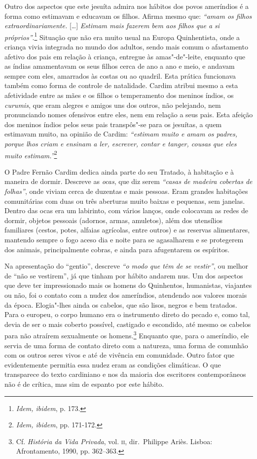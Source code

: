 Outro dos aspectos que este jesuíta admira nos hábitos dos povos
ameríndios é a forma como estimavam e educavam os filhos. Afirma mesmo
que: \textit{``amam os filhos extraordinariamente.} [\ldots{}] \textit{Estimam
mais fazerem bem aos filhos que a si próprios''}.\footnote{ \textit{Idem, ibidem}, 
p. 173.} Situação que não era muito usual na
Europa Quinhentista, onde a criança vivia integrada no mundo dos
adultos, sendo mais comum o afastamento afetivo dos pais em relação à
criança, entregue às amas"-de"-leite, enquanto que as índias amamentavam
os seus filhos cerca de ano a ano e meio, e andavam sempre com eles,
amarrados às costas ou ao quadril. Esta prática funcionava também como
forma de controle de natalidade. Cardim atribui mesmo a esta
afetividade entre as mães e os filhos o temperamento dos meninos
índios, os \textit{curumis}, que eram alegres e amigos uns dos outros,
não pelejando, nem pronunciando nomes ofensivos entre eles, nem em
relação a seus pais. Esta afeição dos meninos índios pelos seus pais
transpôs"-se para os jesuítas, a quem estimavam muito, na opinião de
Cardim: \textit{``estimam muito e amam os padres, porque lhos
criam e ensinam a ler, escrever, contar e tanger, cousas que eles muito
estimam.''}\footnote{ \textit{Idem, ibidem}, pp. 171-172.} 

 O Padre Fernão Cardim dedica ainda parte do seu Tratado, 
à habitação e à maneira de dormir. Descreve as \textit{ocas}, que diz
serem \textit{``casas de madeira cobertas de folhas''}, onde
viviam cerca de duzentas e mais pessoas. Eram grandes habitações
comunitárias com duas ou três aberturas muito baixas e pequenas, sem
janelas. Dentro das ocas era um labirinto, com vários lanços, 
onde colocavam as redes de dormir, objetos pessoais (adornos, armas, amuletos), além dos
utensílios familiares (cestos, potes, alfaias agrícolas, entre outros)
e as reservas alimentares, mantendo sempre o fogo aceso dia e noite
para se agasalharem e se protegerem dos animais, principalmente cobras,
e ainda para afugentarem os espíritos. 

 Na apresentação do ``gentio'', descreve \textit{``o modo
que têm de se vestir''}, ou melhor de ``não se vestirem'', já que
tinham por hábito andarem nus. Um dos aspectos que deve ter
impressionado mais os homens do Quinhentos, humanistas, viajantes ou
não, foi o contato com a nudez dos ameríndios, atendendo aos valores
morais da época. Elogia"-lhes ainda os cabelos, que são lisos, negros e
bem tratados. Para o europeu, o corpo humano era o instrumento direto
do pecado e, como tal, devia de ser o mais coberto possível, castigado
e escondido, até mesmo os cabelos para não atraírem sexualmente os
homens.\footnote{ Cf. \textit{História da Vida Privada}, vol. \textsc{ii},
dir.~Philippe Ariès. Lisboa: Afrontamento, 
1990, pp. 362--363.} Enquanto que, para o ameríndio, ele servia de uma forma de
contato direto com a natureza, uma forma de comunhão com os outros
seres vivos e até de vivência em comunidade. Outro fator que
evidentemente permitia essa nudez eram as condições climáticas. O que
transparece do texto cardiniano e nos da maioria dos escritores
contemporâneos não é de crítica, mas sim de espanto por este hábito.


